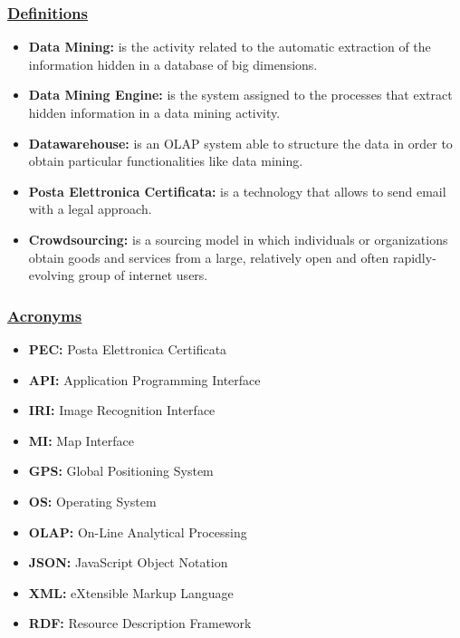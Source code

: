 	\subsubsection[Definitions]{\hyperlink{toc}{Definitions}}
		\begin{itemize}
			\item \textbf{Data Mining:} is the activity related to the automatic extraction of the information hidden in a database of big dimensions.
			\item \textbf{Data Mining Engine:} is the system assigned to the processes that extract hidden information in a data mining activity. 
			\item \textbf{Datawarehouse:} is an OLAP system able to structure the data in order to obtain particular functionalities like data mining.
			\item \textbf{Posta Elettronica Certificata:} is a technology that allows to send email with a legal approach.
			\item \textbf{Crowdsourcing:} is a sourcing model in which individuals or organizations obtain goods and services from a large, relatively open and often rapidly-evolving group of internet users.
		\end{itemize}
	\subsubsection[Acronyms]{\hyperlink{toc}{Acronyms}}
		\begin{itemize}
			\item \textbf{PEC:} Posta Elettronica Certificata
			\item \textbf{API:} Application Programming Interface
			\item \textbf{IRI:} Image Recognition Interface
			\item \textbf{MI:} Map Interface
			\item \textbf{GPS:} Global Positioning System
			\item \textbf{OS:} Operating System
			\item \textbf{OLAP:} On-Line Analytical Processing
			\item \textbf{JSON:} JavaScript Object Notation
			\item \textbf{XML:} eXtensible Markup Language
			\item \textbf{RDF:} Resource Description Framework
		\end{itemize}
